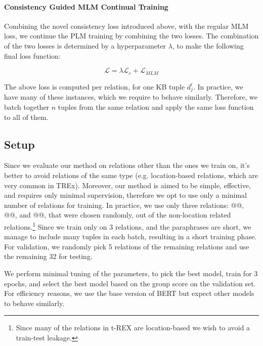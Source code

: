 \paragraph{Consistency Guided MLM Continual Training}

Combining the novel consistency loss introduced above, with the regular MLM loss, we continue the PLM training by combining the two losses. The combination of the two losses is determined by a hyperparameter $\lambda$, to make the following final loss function:

\[
\mathcal{L} = \lambda \mathcal{L}_c + \mathcal{L}_{MLM}
\]

The above loss is computed per relation, for one KB tuple $d_j^i$. In practice, we have many of these instances, which we require to behave similarly. Therefore, we batch together $n$ tuples from the same relation and apply the same loss function to all of them.


\subsection{Setup}

Since we evaluate our method on relations other than the ones we train on, it's better to avoid relations of the same type (e.g. location-based relations, which are very common in TREx).
Moreover, our method is aimed to be simple, effective, and requires only minimal supervision, therefore we opt to use only a minimal number of relations for training.
In practice, we use only three relations: @@, @@, and @@, that were chosen randomly, out of the non-location related relations.\footnote{Since many of the relations in t-REX are location-based we wish to avoid a train-test leakage.} %
Since we train only on 3 relations, and the paraphrases are short, we manage to include many tuples in each batch, resulting in a short training phase.
For validation, we randomly pick 5 relations %
of the remaining relations and use the remaining 32 for testing.

We perform minimal tuning of the parameters, to pick the best model, train for 3 epochs, and select the best model based on the group score on the validation set.
For efficiency reasons, we use the base version of BERT but expect other models to behave similarly.


